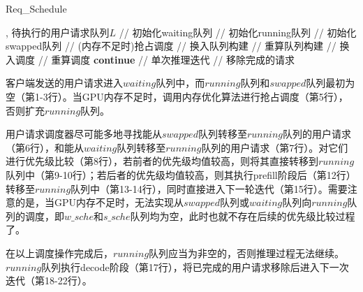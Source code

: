 \begin{algorithm}
  \caption{Req\_Schedule}
  \label{Code:用户请求调度器工作流程}
  \small
  \begin{spacing}{1.2}
    \begin{algorithmic}[1]
      , {待执行的用户请求队列$L$}
        \hfill {// 初始化waiting队列}
       \hfill {// 初始化running队列}
       \hfill {// 初始化swapped队列}
          \hfill {// (内存不足时)抢占调度}
          \hfill {// 换入队列构建}
          \hfill {// 重算队列构建}
            \hfill {// 换入调度}
        \ELSE
            \hfill {// 重算调度}
          \STATE \textbf{continue}
        \ENDIF
         \hfill {// 单次推理迭代}
             \hfill {// 移除完成的请求}
          \ENDIF
        \ENDFOR
      \ENDWHILE
    \end{algorithmic}
  \end{spacing}
\end{algorithm}

客户端发送的用户请求进入$waiting$队列中，而$running$队列和$swapped$队列最初为空（第1-3行）。当GPU内存不足时，调用内存优化算法进行抢占调度（第5行），否则扩充$running$队列。 \par

用户请求调度器尽可能多地寻找能从$swapped$队列转移至$running$队列的用户请求（第6行），和能从$waiting$队列转移至$running$队列的用户请求（第7行）。对它们进行优先级比较（第8行），若前者的优先级均值较高，则将其直接转移到$running$队列中（第9-10行）；若后者的优先级均值较高，则其执行prefill阶段后（第12行）转移至$running$队列中（第13-14行），同时直接进入下一轮迭代（第15行）。需要注意的是，当GPU内存不足时，无法实现从$swapped$队列或$waiting$队列向$running$队列的调度，即$w\_sche$和$s\_sche$队列均为空，此时也就不存在后续的优先级比较过程了。 \par

在以上调度操作完成后，$running$队列应当为非空的，否则推理过程无法继续。$running$队列执行decode阶段（第17行），将已完成的用户请求移除后进入下一次迭代（第18-22行）。 \par

